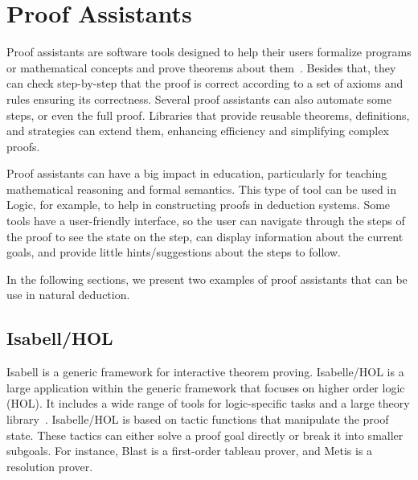 
\section{Proof Assistants}
Proof assistants are software tools designed to help their users formalize programs or mathematical concepts and prove theorems about them~\cite{andersschlichtkrull_2015_formalization}. Besides that, they can check step-by-step that the proof is correct according to a set of axioms and rules ensuring its correctness. Several proof assistants can also automate some steps, or even the full proof. Libraries that provide reusable theorems, definitions, and strategies can extend them, enhancing efficiency and simplifying complex proofs.

Proof assistants can have a big impact in education, particularly for teaching mathematical reasoning and formal semantics. This type of tool can be used in Logic, for example, to help in constructing proofs in deduction systems. Some tools have a user-friendly interface, so the user can navigate through the steps of the proof to see the state on the step, can display information about the current goals, and provide little hints/suggestions about the steps to follow.

In the following sections, we present two examples of proof assistants that can be use in natural deduction.

\subsection{Isabell/HOL}
Isabell is a generic framework for interactive theorem proving. Isabelle/HOL is a large application within the generic framework that focuses on higher order logic (HOL). It includes a wide range of tools for logic-specific tasks and a large theory library~\cite{wenzel_the,blanchette_automatic}. Isabelle/HOL is based on tactic functions that manipulate the proof state. These tactics can either solve a proof goal directly or break it into smaller subgoals. For instance, Blast is a first-order tableau prover, and Metis is a resolution prover.

